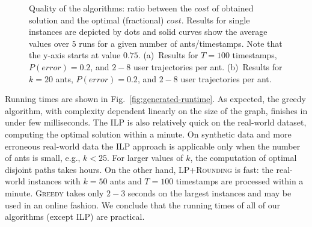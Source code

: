 \documentclass{llncs}
\newcommand{\alg}[1]{\textsc{#1}}
\begin{document}
\begin{figure}[tb]
    \center
\hfill
    \caption{Quality of the algorithms:
    ratio between the $cost$ of obtained solution and the optimal (fractional) $cost$.
    Results for single instances are depicted by dots and solid
    curves show the average values over $5$ runs
    for a given number of ants/timestamps.
    Note that the y-axis starts at value $0.75$.
    (a)~Results for $T=100$ timestamps, $P(error)=0.2$, and $2-8$ user trajectories per ant.
    (b)~Results for $k=20$ ants, $P(error)=0.2$, and $2-8$ user trajectories per ant.}
    \label{fig:generated}
\end{figure}

Running times are shown in Fig.~\ref{fig:generated-runtime}.
As expected, the greedy algorithm, with complexity dependent
linearly on the size of the graph, finishes in under few milliseconds.
The ILP is also relatively quick on the real-world dataset, computing the optimal solution within a minute.
On synthetic data and more erroneous real-world data
the
\alg{ILP} approach is applicable only when the number of ants is small, e.g., $k<25$. For larger values of $k$, the computation of optimal disjoint paths takes hours. On the other hand, \alg{LP+Rounding} is fast: the real-world
instances with $k=50$ ants and $T=100$ timestamps are processed within a minute. \alg{Greedy} takes only $2-3$ seconds on the largest instances and may be used in an online fashion. We conclude that the running times of all of our algorithms (except \alg{ILP}) are practical.
\end{document}
